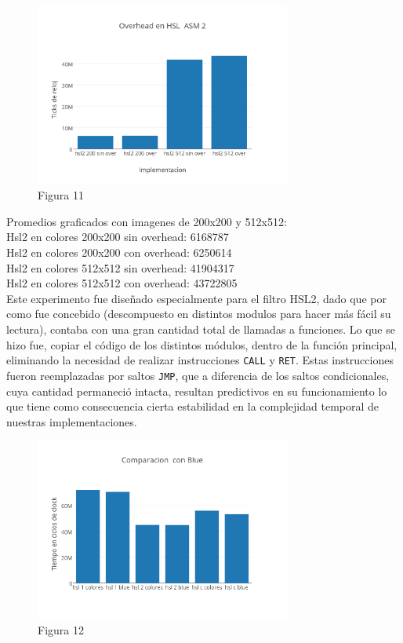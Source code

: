 \documentclass[a4paper]{article}
\begin{document}
\begin{figure}[h]
  \centering
    \includegraphics[width=0.75\textwidth]{imagenes/OverheadEnHSLASM2.png}
  \caption{Figura 11}
  \label{fig:graficohsl5}
\end{figure}
 \FloatBarrier

Promedios graficados con imagenes de 200x200 y 512x512:
\\

Hsl2 en colores 200x200 sin overhead: 6168787
\\

Hsl2 en colores 200x200 con overhead: 6250614
\\

Hsl2 en colores 512x512 sin overhead: 41904317
\\

Hsl2 en colores 512x512 con overhead: 43722805
\\

Este experimento fue diseñado especialmente para el filtro HSL2, dado que por como fue concebido (descompuesto en distintos modulos para hacer más fácil su lectura), contaba con una gran cantidad total de llamadas a funciones. Lo que se hizo fue, copiar el código de los distintos módulos, dentro de la función principal, eliminando la necesidad de realizar instrucciones {\tt CALL} y {\tt RET}. Estas instrucciones fueron reemplazadas por saltos {\tt JMP}, que a diferencia de los saltos condicionales, cuya cantidad permaneció intacta, resultan predictivos en su funcionamiento lo que tiene como consecuencia cierta estabilidad en la complejidad temporal de nuestras implementaciones.

\begin{figure}[h]
  \centering
    \includegraphics[width=0.75\textwidth]{imagenes/ComparacionConBlue.png}
  \caption{Figura 12}
  \label{fig:graficohsl6}
\end{figure}
 \FloatBarrier
\end{document}
